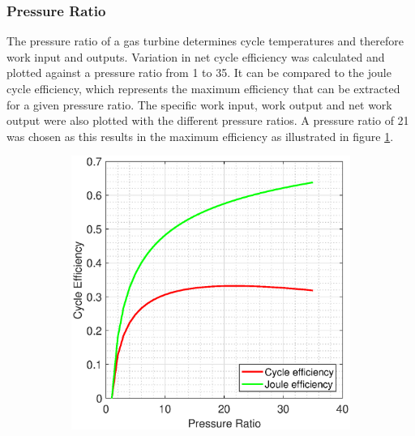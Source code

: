 \documentclass[11pt, oneside]{article}
\begin{document}
\subsubsection{Pressure Ratio} 
The pressure ratio of a gas turbine determines cycle temperatures and therefore work input and outputs. Variation in net cycle efficiency was calculated and plotted against a pressure ratio from 1 to 35. It can be compared to the joule cycle efficiency, which represents the maximum efficiency that can be extracted for a given pressure ratio. The specific work input, work output and net work output were also plotted with the different pressure ratios. A pressure ratio of 21 was chosen as this results in the maximum efficiency as illustrated in figure \ref{fig:efficiencysimple}.
 \begin{figure} [h]
\centering
\begin{subfigure}{.7\textwidth}
\centering
 \includegraphics[width=0.9\linewidth]{./pictures/efficiencysimple.eps}
  \label{fig:efficiencysimple}
\end{subfigure}
\begin{subfigure}{.7\textwidth}
 \centering

\end{subfigure}
\end{figure}
\end{document}
